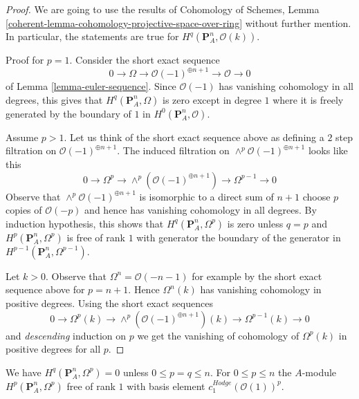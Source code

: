 \begin{proof}
We are going to use the results of Cohomology of Schemes, Lemma
\ref{coherent-lemma-cohomology-projective-space-over-ring}
without further mention. In particular, the statements are true
for $H^q(\mathbf{P}^n_A, \mathcal{O}(k))$.

\medskip\noindent
Proof for $p = 1$. Consider the short exact sequence
$$
0 \to \Omega \to \mathcal{O}(-1)^{\oplus n + 1} \to \mathcal{O} \to 0
$$
of Lemma \ref{lemma-euler-sequence}. Since $\mathcal{O}(-1)$ has
vanishing cohomology in all degrees, this gives that
$H^q(\mathbf{P}^n_A, \Omega)$ is zero except in degree $1$
where it is freely generated by the boundary of $1$ in
$H^0(\mathbf{P}^n_A, \mathcal{O})$.

\medskip\noindent
Assume $p > 1$. Let us think of the short exact sequence
above as defining a $2$ step filtration on $\mathcal{O}(-1)^{\oplus n + 1}$.
The induced filtration on $\wedge^p\mathcal{O}(-1)^{\oplus n + 1}$ looks
like this
$$
0 \to \Omega^p \to \wedge^p\left(\mathcal{O}(-1)^{\oplus n + 1}\right)
\to \Omega^{p - 1} \to 0
$$
Observe that $\wedge^p\mathcal{O}(-1)^{\oplus n + 1}$ is isomorphic
to a direct sum of $n + 1$ choose $p$ copies of $\mathcal{O}(-p)$
and hence has vanishing cohomology in all degrees.
By induction hypothesis, this shows that $H^q(\mathbf{P}^n_A, \Omega^p)$
is zero unless $q = p$ and $H^p(\mathbf{P}^n_A, \Omega^p)$ is free
of rank $1$ with generator the boundary of the generator in
$H^{p - 1}(\mathbf{P}^n_A, \Omega^{p - 1})$.

\medskip\noindent
Let $k > 0$. Observe that $\Omega^n = \mathcal{O}(-n - 1)$ for example
by the short exact sequence above for $p = n + 1$.
Hence $\Omega^n(k)$ has vanishing cohomology in positive degrees.
Using the short exact sequences
$$
0 \to \Omega^p(k) \to \wedge^p\left(\mathcal{O}(-1)^{\oplus n + 1}\right)(k)
\to \Omega^{p - 1}(k) \to 0
$$
and {\it descending} induction on $p$ we get the vanishing of
cohomology of $\Omega^p(k)$ in positive degrees for all $p$.
\end{proof}

\begin{lemma}
\label{lemma-hodge-cohomology-projective-space}
We have $H^q(\mathbf{P}^n_A, \Omega^p) = 0$
unless $0 \leq p = q \leq n$. For $0 \leq p \leq n$ the $A$-module
$H^p(\mathbf{P}^n_A, \Omega^p)$ free of rank $1$ with basis element
$c_1^{Hodge}(\mathcal{O}(1))^p$.
\end{lemma}

